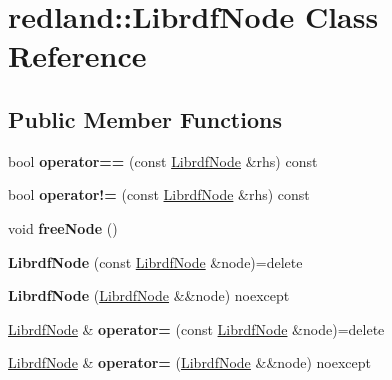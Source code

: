 \hypertarget{classredland_1_1LibrdfNode}{}\section{redland\+:\+:Librdf\+Node Class Reference}
\label{classredland_1_1LibrdfNode}
\subsection*{Public Member Functions}
\begin{DoxyCompactItemize}
\item 
\mbox{\label{classredland_1_1LibrdfNode_afc1bdf57705253e8204a394541b96ca7}} 
bool {\bfseries operator==} (const \hyperlink{classredland_1_1LibrdfNode}{Librdf\+Node} \&rhs) const
\item 
\mbox{\label{classredland_1_1LibrdfNode_aefbf9e2bf34eb0171932e39323eadfd8}} 
bool {\bfseries operator!=} (const \hyperlink{classredland_1_1LibrdfNode}{Librdf\+Node} \&rhs) const
\item 
\mbox{\label{classredland_1_1LibrdfNode_a28f6ce060bddf7e1cb88d17d4d4ea81a}} 
void {\bfseries free\+Node} ()
\item 
\mbox{\label{classredland_1_1LibrdfNode_a669557dc1240dc17c3a7a3a61d2400d9}} 
{\bfseries Librdf\+Node} (const \hyperlink{classredland_1_1LibrdfNode}{Librdf\+Node} \&node)=delete
\item 
\mbox{\label{classredland_1_1LibrdfNode_a822ce6a4221315abe5768b278b83d0e5}} 
{\bfseries Librdf\+Node} (\hyperlink{classredland_1_1LibrdfNode}{Librdf\+Node} \&\&node) noexcept
\item 
\mbox{\label{classredland_1_1LibrdfNode_abce52c34cc89e48886cde07aa5e113c9}} 
\hyperlink{classredland_1_1LibrdfNode}{Librdf\+Node} \& {\bfseries operator=} (const \hyperlink{classredland_1_1LibrdfNode}{Librdf\+Node} \&node)=delete
\item 
\mbox{\label{classredland_1_1LibrdfNode_a9de3a69b00958b2bb50646dbf0aa8d7e}} 
\hyperlink{classredland_1_1LibrdfNode}{Librdf\+Node} \& {\bfseries operator=} (\hyperlink{classredland_1_1LibrdfNode}{Librdf\+Node} \&\&node) noexcept

\end{DoxyCompactItemize}
